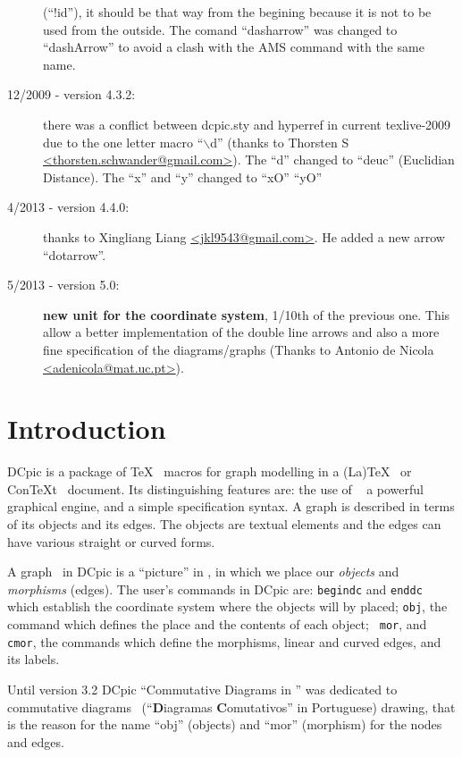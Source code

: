 \documentclass[11pt]{article}
\begin{document}
\begin{description}
  (``!id''), it should be that way from the begining because it is not
  to be used from the outside.  The comand ``dasharrow'' was changed
  to ``dashArrow'' to avoid a clash with the AMS command with the same
  name.
\item[12/2009 - version 4.3.2:] there was a conflict between dcpic.sty
  and hyperref in current texlive-2009 due to the one letter macro
  ``$\backslash$d'' (thanks to Thorsten S
  \url{<thorsten.schwander@gmail.com>}).  The ``d'' changed to
  ``deuc'' (Euclidian Distance). The ``x'' and ``y'' changed to ``xO''
  ``yO''
\item[4/2013 - version 4.4.0:] thanks to Xingliang Liang
  \url{<jkl9543@gmail.com>}. He added a new arrow ``dotarrow''.
\item[5/2013 - version 5.0:] {\bf new unit for the coordinate system},
  1/10th of the previous one. This allow a better implementation of
  the double line arrows and also a more fine specification of the
  diagrams/graphs (Thanks to Antonio de Nicola
  \url{<adenicola@mat.uc.pt>}).
\end{description}


\section{Introduction}

DCpic is a package of \TeX~\cite{Knuth86} macros for graph modelling
in a (La)\TeX~\cite{Lamport94} or Con\TeX t~\cite{Otten99}
document. Its distinguishing features are: the use of
\PiCTeX~\cite{Wichura92} a powerful graphical engine, and a simple
specification syntax. A graph is described in terms of its objects and
its edges. The objects are textual elements and the edges can have
various straight or curved forms.

A graph~\cite{Harary72} in DCpic is a ``picture'' in \PiCTeX, in which
we place our {\em objects} and {\em morphisms} (edges). The user's
commands in DCpic are: {\tt begindc} and {\tt enddc} which establish
the coordinate system where the objects will by placed; {\tt obj}, the
command which defines the place and the contents of each object; {\tt
mor}, and {\tt cmor}, the commands which define the morphisms, linear
and curved edges, and its labels.

Until version 3.2 DCpic ``Commutative Diagrams in \PiCTeX'' was
dedicated to commutative diagrams~\cite{Pierce98} (``{\bf D}iagramas
{\bf C}omutativos'' in Portuguese) drawing, that is the reason for the
name ``obj'' (objects) and ``mor'' (morphism) for the nodes and edges.
\end{document}
